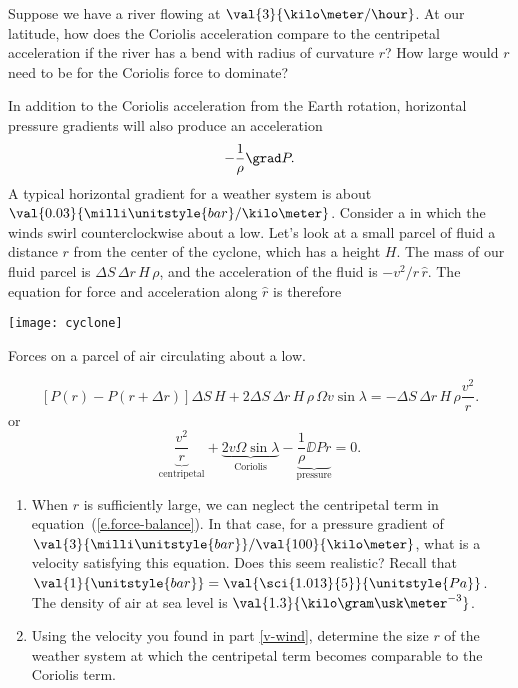 \begin{exercisebox}
Suppose we have a river flowing at $\val{3}{\kilo\meter/\hour}$.  At our latitude, how does the Coriolis acceleration compare to the centripetal acceleration if the river has a bend with radius of curvature $r$?  How large would $r$ need to be for the Coriolis force to dominate?
\end{exercisebox}

In addition to the Coriolis acceleration from the Earth rotation, horizontal pressure gradients will also produce an acceleration
\[
	-\frac{1}{\rho}\grad P.
\]
A typical horizontal gradient for a weather system is about $\val{0.03}{\milli\unitstyle{bar}/\kilo\meter}$.
Consider a  in which the winds swirl counterclockwise about a low.  Let's look at a small parcel of fluid a distance $r$ from the center of the cyclone, which has a height $H$. The mass of our fluid parcel is $\Delta S\,\Delta r\,H\,\rho$, and the acceleration of the fluid is $-v^{2}/r\,\hat{r}$. The equation for force and acceleration along $\hat{r}$ is therefore
\begin{marginfigure}[-4\baselineskip]
\texttt{[image: cyclone]}
\caption{Forces on a parcel of air circulating about a low.
\label{f.cyclone}}
\end{marginfigure}
\[
	\left[P(r)-P(r+\Delta r)\right]\Delta S\,H + 2\Delta S\,\Delta r\,H\,\rho\,\Omega v\sin\lambda = -\Delta S\,\Delta r\,H\,\rho \frac{v^{2}}{r}.
\]
or
\begin{equation}\label{e.force-balance}
	\underbrace{\frac{v^{2}}{r}}_{\textrm{centripetal}} 
	+ \underbrace{2 v\Omega\sin\lambda}_{\mathrm{Coriolis}} 
	- \underbrace{\frac{1}{\rho}\DD{P}{r}}_{\mathrm{pressure}} = 0.
\end{equation}

\begin{exercisebox}
\begin{enumerate}
\renewcommand{\theenumi}{\alph{enumi}}
\renewcommand{\labelenumi}{\alph{enumi})}
\item\label{v-wind}
When $r$ is sufficiently large, we can neglect the centripetal term in equation~(\ref{e.force-balance}).  In that case, for a pressure gradient of $\val{3}{\milli\unitstyle{bar}}/\val{100}{\kilo\meter}$, what is a velocity satisfying this equation. Does this seem realistic? Recall that $\val{1}{\unitstyle{bar}} = \val{\sci{1.013}{5}}{\unitstyle{Pa}}$.  The density of air at sea level is $\val{1.3}{\kilo\gram\usk\meter^{-3}}$.

\item Using the velocity you found in part \ref{v-wind}, determine the size $r$ of the weather system at which the centripetal term becomes comparable to the Coriolis term.
\end{enumerate}
\end{exercisebox}

